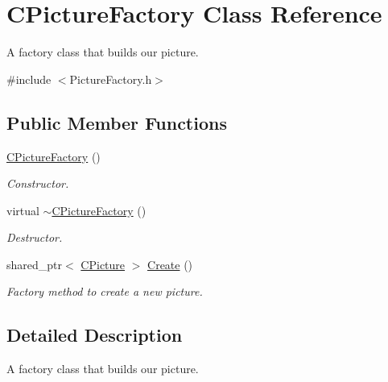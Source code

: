 \hypertarget{class_c_picture_factory}{\section{C\+Picture\+Factory Class Reference}
\label{class_c_picture_factory}
}


A factory class that builds our picture.  




{\ttfamily \#include $<$Picture\+Factory.\+h$>$}

\subsection*{Public Member Functions}
\begin{DoxyCompactItemize}
\item 
\hypertarget{class_c_picture_factory_a70c077bc0e10a447b60b2a57c37fd982}{\hyperlink{class_c_picture_factory_a70c077bc0e10a447b60b2a57c37fd982}{C\+Picture\+Factory} ()}\label{class_c_picture_factory_a70c077bc0e10a447b60b2a57c37fd982}

\begin{DoxyCompactList}\small\item\em Constructor. \end{DoxyCompactList}\item 
\hypertarget{class_c_picture_factory_a3a5867e1e4757926826b71e1a6983764}{virtual \hyperlink{class_c_picture_factory_a3a5867e1e4757926826b71e1a6983764}{$\sim$\+C\+Picture\+Factory} ()}\label{class_c_picture_factory_a3a5867e1e4757926826b71e1a6983764}

\begin{DoxyCompactList}\small\item\em Destructor. \end{DoxyCompactList}\item 
shared\+\_\+ptr$<$ \hyperlink{class_c_picture}{C\+Picture} $>$ \hyperlink{class_c_picture_factory_a8510a417b59de544ce40715f8d790d08}{Create} ()
\begin{DoxyCompactList}\small\item\em Factory method to create a new picture. \end{DoxyCompactList}\end{DoxyCompactItemize}


\subsection{Detailed Description}
A factory class that builds our picture. 

